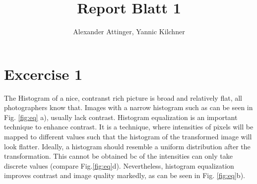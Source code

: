 \documentclass[11pt,a4paper]{article}
\author{Alexander Attinger, Yannic Kilchner}
\title{Report Blatt 1}
\begin{document}
\maketitle
\section{Excercise 1}
The Histogram of a nice, contranst rich picture is broad and relatively flat, all photographers know that. Images with a narrow histogram such as can be seen in Fig. \ref{fig:eq} a), usually lack contrast. Histogram equalization is an important technique to enhance contrast. It is a technique, where intensities of pixels will be mapped to different values such that the histogram of the transformed image will look flatter. Ideally, a histogram should resemble a uniform distribution after the transformation. This cannot be obtained bc of the intensities can only take discrete values (compare Fig.\ref{fig:eq}d). Nevertheless, histogram equalization improves contrast and image quality markedly, as can be seen in Fig. \ref{fig:eq}b).
\end{document}
